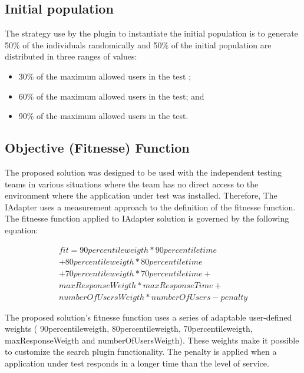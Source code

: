 \subsection{Initial population}

The strategy use by the plugin to instantiate the initial population is to generate 50\% of the individuals randomically and 50\% of the initial population are distributed in three  ranges of values:

\begin{itemize}
\item 30\% of the maximum allowed users in the test ;
\item 60\% of the maximum allowed users in the test; and
\item 90\% of the maximum allowed users in the test.
\end{itemize}


\subsection{Objective (Fitnesse) Function}

The proposed solution was designed to be used with the independent testing teams in various situations where the team has no direct access to the environment where the application under test was installed. Therefore,  The IAdapter uses a measurement approach to the definition of the fitnesse function. The fitnesse function applied to IAdapter solution is governed by the following equation:

\begin{equation}
\begin{aligned}
fit=90percentileweigth* 90percentiletime\\
+80percentileweigth*80percentiletime\\+
70percentileweigth*70percentiletime+\\
maxResponseWeigth*maxResponseTime+\\
numberOfUsersWeigth*numberOfUsers-penalty
\end{aligned}
\end{equation}

The proposed solution's fitnesse function uses a series of adaptable user-defined weights ( 90percentileweigth, 80percentileweigth,  70percentileweigth, maxResponseWeigth and numberOfUsersWeigth). These weights make it possible to customize the search plugin functionality. The penalty is applied when a application under test responds in a longer time than the level of service.



